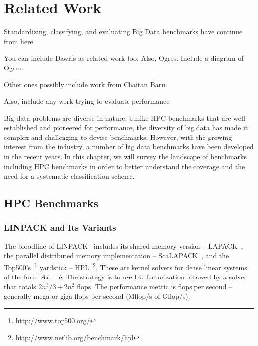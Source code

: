 \chapter{Related Work}
\label{ch:relatedwork}
Standardizing, classifying, and evaluating Big Data benchmarks have continue from here

You can include Dawrfs as related work too. Also, Ogres. Include a diagram of Ogres.

Other ones possibly include work from Chaitan Baru.

Also, include any work trying to evaluate performance


Big data problems are diverse in nature. Unlike \ac{HPC} benchmarks that are well-established and pioneered for performance, the diversity of big data has made it complex and challenging to devise benchmarks. However, with the growing interest from the industry, a number of big data benchmarks have been developed in the recent years. In this chapter, we will survey the landscape of benchmarks including \ac{HPC} benchmarks in order to better understand the coverage and the need for a systematic classification scheme.

\section{\ac{HPC} Benchmarks}
\subsection{LINPACK and Its Variants}
The bloodline of \acs{LINPACK}~\cite{Dongarra1988} includes its shared memory version – \acs{LAPACK}~\cite{Anderson:1990:LPL:110382.110385}, the parallel distributed memory implementation – \acs{ScaLAPACK}~\cite{1392882}, and the Top500’s~\footnote{http://www.top500.org/} yardstick – \acs{HPL}~\footnote{http://www.netlib.org/benchmark/hpl}. These are kernel solvers for dense linear systems of the form $Ax=b$. The strategy is to use \ac{LU} factorization followed by a solver that totals $2n^3/3+2n^2$ \acp{flop}. The performance metric is \acp{flop} per second – generally mega or giga \acp{flop} per second (Mflop/s of Gflop/s).

